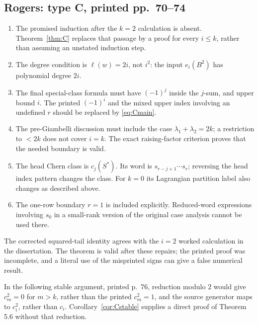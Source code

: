 \documentclass[11pt,letterpaper]{article}
\theoremstyle{remark}
\begin{document}
\subsection{Rogers: type C, printed pp.\ 70--74}
\begin{enumerate}
 \item The promised induction after the $k=2$ calculation is absent. Theorem~\ref{thm:C} replaces that passage by a proof for every $i\leq k$, rather than assuming an unstated induction step.
 \item The degree condition is $\ell(w)=2i$, not $i^2$: the input $e_i(B^2)$ has polynomial degree $2i$.
 \item The final special-class formula must have $(-1)^j$ inside the $j$-sum, and upper bound $i$. The printed $(-1)^i$ and the mixed upper index involving an undefined $r$ should be replaced by \eqref{eq:Cmain}.
 \item The pre-Giambelli discussion must include the case $\lambda_1+\lambda_2=2k$; a restriction to $<2k$ does not cover $i=k$. The exact raising-factor criterion proves that the needed boundary is valid.
 \item The head Chern class is $c_j(S^*)$. Its word is $s_{r-j+1}\cdots s_r$; reversing the head index pattern changes the class. For $k=0$ its Lagrangian partition label also changes as described above.
 \item The one-row boundary $r=1$ is included explicitly. Reduced-word expressions involving $s_0$ in a small-rank version of the original case analysis cannot be used there.
\end{enumerate}
The corrected squared-tail identity agrees with the $i=2$ worked calculation in the dissertation. The theorem is valid after these repairs; the printed proof was incomplete, and a literal use of the misprinted signs can give a false numerical result.

In the following stable argument, printed p.~76, reduction modulo 2 would give $c_m^2=0$ for $m>k$, rather than the printed $c_m^2=1$, and the source generator maps to $c_i^2$, rather than $c_i$. Corollary~\ref{cor:Cstable} supplies a direct proof of Theorem 5.6 without that reduction.
\end{document}
